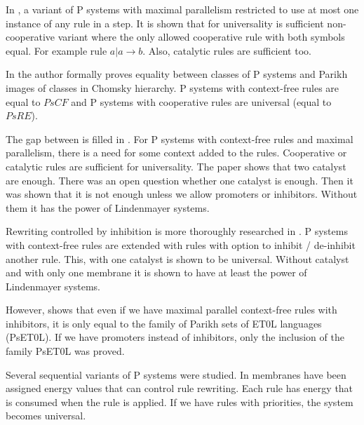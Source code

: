 \documentclass[llncs,submission,copyright,creativecommons]{../lib/lncs/llncs}
\begin{document}

In \cite{Ibarra04dang}, a variant of P systems with maximal parallelism restricted to use at most one instance of any rule in a step. It is shown that for universality is sufficient non-cooperative variant where the only allowed cooperative rule with both symbols equal. For example rule $a|a\rightarrow b$. Also, catalytic rules are sufficient too.


In \cite{Sburlan05dragos} the author formally proves equality between classes of P systems and Parikh images of classes in Chomsky hierarchy. P systems with context-free rules are equal to $PsCF$ and P systems with cooperative rules are universal (equal to $PsRE$).


The gap between is filled in \cite{Ionescu:jucs_10_5:on_p_systems_with}. For P systems with context-free rules and maximal parallelism, there is a need for some context added to the rules. Cooperative or catalytic rules are sufficient for universality. The paper shows that two catalyst are enough. There was an open question whether one catalyst is enough. Then it was shown that it is not enough unless we allow promoters or inhibitors. Without them it has the power of Lindenmayer systems.


Rewriting controlled by inhibition is more thoroughly researched in \cite{Cavaliere:2004:IRP:2144633.2144648}. P systems with context-free rules are extended with rules with option to inhibit / de-inhibit another rule. This, with one catalyst is shown to be universal. Without catalyst and with only one membrane it is shown to have at least the power of Lindenmayer systems.


However, \cite{doi:10.1142/S0129054106003772} shows that even if we have maximal parallel context-free rules with inhibitors, it is only equal to the family of Parikh sets of ET0L languages (PsET0L). If we have promoters instead of inhibitors, only the inclusion of the family PsET0L was proved. %


Several sequential variants of P systems were studied. In \cite{Freund:2004:SPS:2149813.2149831} membranes have been assigned energy values that can control rule rewriting. Each rule has energy that is consumed when the rule is applied. If we have rules with priorities, the system becomes universal.
\end{document}

